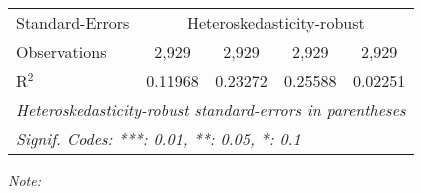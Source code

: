 \begin{table}[htbp!]
\begin{adjustbox}{width = 1\textwidth, max height = 0.95\textheight, center}
\begin{threeparttable}[b]
\begin{tabular}{lcccc}
            \midrule 
            Standard-Errors & \multicolumn{4}{c}{Heteroskedasticity-robust} \\ 
            Observations         & 2,929                          & 2,929                          & 2,929                           & 2,929\\  
            R$^2$                & 0.11968                        & 0.23272                        & 0.25588                         & 0.02251\\  
            \midrule \midrule
            \multicolumn{5}{l}{\emph{Heteroskedasticity-robust standard-errors in parentheses}}\\
            \multicolumn{5}{l}{\emph{Signif. Codes: ***: 0.01, **: 0.05, *: 0.1}}\\
         \end{tabular}
         
         \begin{tablenotes}\item \medskip \textit{Note:}
         \end{tablenotes}
      \end{threeparttable}
   \end{adjustbox}
\end{table}


